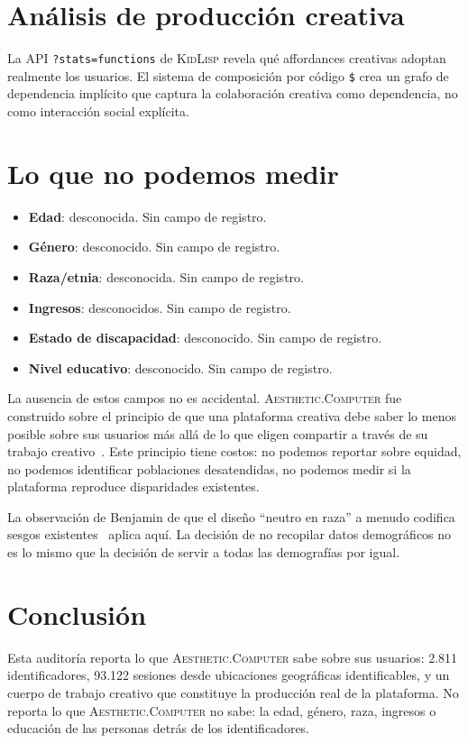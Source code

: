 \documentclass[10pt,letterpaper,twocolumn]{article}
\newcommand{\ac}{\textsc{Aesthetic.Computer}}
\newcommand{\kl}{\textsc{KidLisp}}
\begin{document}
\section{Análisis de producción creativa}

La API \texttt{?stats=functions} de \kl{} revela qué affordances creativas adoptan realmente los usuarios. El sistema de composición por código \texttt{\$} crea un grafo de dependencia implícito que captura la colaboración creativa como dependencia, no como interacción social explícita.

\section{Lo que no podemos medir}

\begin{itemize}
  \item \textbf{Edad}: desconocida. Sin campo de registro.
  \item \textbf{Género}: desconocido. Sin campo de registro.
  \item \textbf{Raza/etnia}: desconocida. Sin campo de registro.
  \item \textbf{Ingresos}: desconocidos. Sin campo de registro.
  \item \textbf{Estado de discapacidad}: desconocido. Sin campo de registro.
  \item \textbf{Nivel educativo}: desconocido. Sin campo de registro.
\end{itemize}

La ausencia de estos campos no es accidental. \ac{} fue construido sobre el principio de que una plataforma creativa debe saber lo menos posible sobre sus usuarios más allá de lo que eligen compartir a través de su trabajo creativo~\citep{illich1973tools}. Este principio tiene costos: no podemos reportar sobre equidad, no podemos identificar poblaciones desatendidas, no podemos medir si la plataforma reproduce disparidades existentes.

La observación de Benjamin de que el diseño ``neutro en raza'' a menudo codifica sesgos existentes~\citep{benjamin2019race} aplica aquí. La decisión de no recopilar datos demográficos no es lo mismo que la decisión de servir a todas las demografías por igual.

\section{Conclusión}

Esta auditoría reporta lo que \ac{} sabe sobre sus usuarios: 2.811 identificadores, 93.122 sesiones desde ubicaciones geográficas identificables, y un cuerpo de trabajo creativo que constituye la producción real de la plataforma. No reporta lo que \ac{} no sabe: la edad, género, raza, ingresos o educación de las personas detrás de los identificadores.
\end{document}
